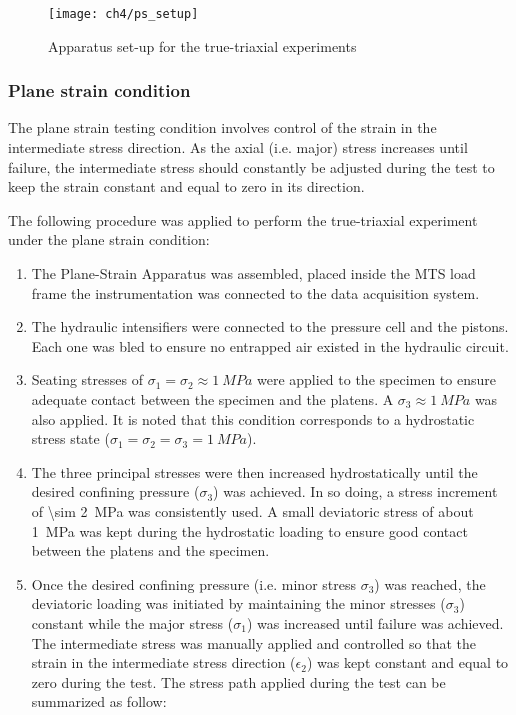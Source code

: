 \begin{figure}[tb]
    \centering
    \texttt{[image: ch4/ps\_setup]}
    \caption{Apparatus set-up for the true-triaxial experiments}
    \label{fig4:8}
\end{figure} 

\subsubsection{Plane strain condition}

The plane strain testing condition involves control of the strain in the intermediate stress direction. As the axial (i.e. major) stress increases until failure, the intermediate stress should constantly be adjusted during the test to keep the strain constant and equal to zero in its direction.

The following procedure was applied to perform the true-triaxial experiment under the plane strain condition:  

\begin{enumerate}
    \item The Plane-Strain Apparatus was assembled, placed inside the MTS load frame the instrumentation was connected to the data acquisition system.
    \item The hydraulic intensifiers were connected to the pressure cell and the pistons. Each one was bled to ensure no entrapped air existed in the hydraulic circuit. 
    \item Seating stresses of $\sigma_1 = \sigma_2 \approx \SI{1}{MPa}$ were applied to the specimen to ensure adequate contact between the specimen and the platens. A $\sigma_3 \approx \SI{1}{MPa}$ was also applied. It is noted that this condition corresponds to a hydrostatic stress state ($\sigma_1 = \sigma_2 = \sigma_3 = \SI{1}{MPa}$).
    \item The three principal stresses were then increased hydrostatically until the desired confining pressure ($\sigma_3$) was achieved. In so doing, a stress increment of \SI{\sim 2}{MPa} was consistently used. A small deviatoric stress of about \SI{1}{MPa} was kept during the hydrostatic loading to ensure good contact between the platens and the specimen.
    \item Once the desired confining pressure (i.e. minor stress $\sigma_3$) was reached, the deviatoric loading was initiated by maintaining the minor stresses ($\sigma_3$) constant while the major stress ($\sigma_1$) was increased until failure was achieved. The intermediate stress was manually applied and controlled so that the strain in the intermediate stress direction ($\epsilon_2$) was kept constant and equal to zero during the test.  The stress path applied during the test can be summarized as follow:
\end{enumerate}

